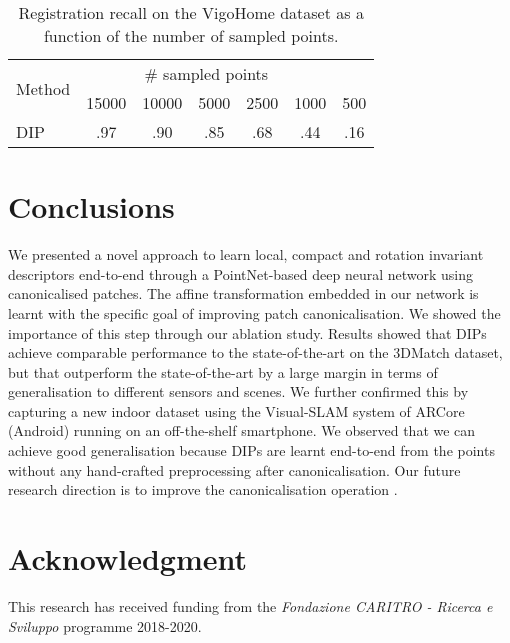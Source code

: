 \documentclass[a4paper,conference]{IEEEtran}
\begin{document}
\begin{table}[t]
    \tabcolsep 3pt
    \centering
    \caption{Registration recall on the VigoHome dataset as a function of the number of sampled points.}
\label{tab:vigohome_abl}
\begin{tabular}{lcccccc}
        \toprule
        \multirow{2}{*}{Method} & \multicolumn{5}{c}{\# sampled points} \\
        & 15000 & 10000 & 5000 & 2500 & 1000 & 500 \\
        \toprule
        DIP & .97 & .90 & .85 & .68 & .44 & .16 \\
        \bottomrule
    \end{tabular}
\end{table}
 
\section{Conclusions}

We presented a novel approach to learn local, compact and rotation invariant descriptors end-to-end through a PointNet-based deep neural network using canonicalised patches.
The affine transformation embedded in our network is learnt with the specific goal of improving patch canonicalisation.
We showed the importance of this step through our ablation study.
Results showed that DIPs achieve comparable performance to the state-of-the-art on the 3DMatch dataset, but that outperform the state-of-the-art by a large margin in terms of generalisation to different sensors and scenes.
We further confirmed this by capturing a new indoor dataset using the Visual-SLAM system of ARCore (Android) running on an off-the-shelf smartphone.
We observed that we can achieve good generalisation because DIPs are learnt end-to-end from the points without any hand-crafted preprocessing after canonicalisation. 
Our future research direction is to improve the canonicalisation operation \cite{Melzi2019}.
 
\section*{Acknowledgment}
This research has received funding from the \emph{Fondazione CARITRO - Ricerca e Sviluppo} programme 2018-2020.



\end{document}

